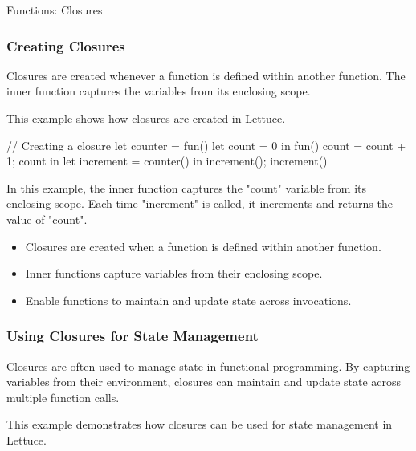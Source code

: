 \begin{notes}{Functions: Closures}
    \subsubsection*{Creating Closures}
    
    Closures are created whenever a function is defined within another function. The inner function captures the variables from its enclosing scope.
    
    \begin{highlight}
    
        This example shows how closures are created in Lettuce.
    
    \begin{code}[Lettuce]
    // Creating a closure
    let counter = fun() {
        let count = 0 in
        fun() {
            count = count + 1;
            count
        }
    } in
    let increment = counter() in
    increment(); increment()
    \end{code}
    
        In this example, the inner function captures the "count" variable from its enclosing scope. Each time "increment" is called, it increments and returns the value of "count".
    
        \begin{itemize}
            \item Closures are created when a function is defined within another function.
            \item Inner functions capture variables from their enclosing scope.
            \item Enable functions to maintain and update state across invocations.
        \end{itemize}
    
    \end{highlight}
    
    \subsubsection*{Using Closures for State Management}
    
    Closures are often used to manage state in functional programming. By capturing variables from their environment, closures can maintain and update state across multiple function calls.
    
    \begin{highlight}
    
        This example demonstrates how closures can be used for state management in Lettuce.
    

\end{highlight}
\end{notes}
